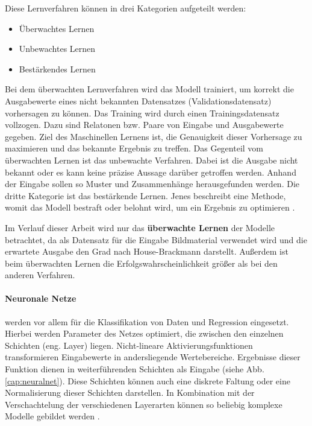Diese  Lernverfahren können in drei Kategorien aufgeteilt werden:
\begin{itemize}
  \setlength\itemsep{-0.5em}
\item Überwachtes Lernen
\item Unbewachtes Lernen
\item Bestärkendes Lernen
\end{itemize}

Bei dem überwachten Lernverfahren wird das Modell trainiert, um korrekt die Ausgabewerte eines nicht bekannten Datensatzes (Validationsdatensatz) vorhersagen zu können. Das Training wird durch einen Trainingsdatensatz vollzogen. Dazu sind Relatonen bzw. Paare von Eingabe und Ausgabewerte gegeben. Ziel des Maschinellen Lernens ist, die Genauigkeit dieser Vorhersage zu maximieren und das bekannte Ergebnis zu treffen. Das Gegenteil vom überwachten Lernen ist das unbewachte Verfahren. Dabei ist die Ausgabe nicht bekannt oder es kann keine präzise Aussage darüber getroffen werden. Anhand der Eingabe sollen so Muster und Zusammenhänge herausgefunden werden. Die dritte Kategorie ist das bestärkende Lernen. Jenes beschreibt eine Methode, womit das Modell bestraft oder belohnt wird, um ein Ergebnis zu optimieren \cite{machinelearning_1}.

Im Verlauf dieser Arbeit wird nur das \textbf{überwachte Lernen} der Modelle betrachtet, da als Datensatz für die Eingabe Bildmaterial verwendet wird und die erwartete Ausgabe den Grad nach House-Brackmann darstellt. Außerdem ist beim überwachten Lernen die Erfolgswahrscheinlichkeit größer als bei den anderen Verfahren.


\paragraph{Neuronale Netze} werden vor allem für die Klassifikation von Daten und Regression eingesetzt. Hierbei werden Parameter des Netzes optimiert, die zwischen den einzelnen Schichten (eng. Layer) liegen. Nicht-lineare Aktivierungsfunktionen transformieren Eingabewerte in andersliegende Wertebereiche. Ergebnisse dieser Funktion dienen in weiterführenden Schichten als Eingabe (siehe Abb. \ref{cap:neuralnet}). Diese Schichten können auch eine diskrete Faltung oder eine Normalisierung dieser Schichten darstellen. In Kombination mit der Verschachtelung der verschiedenen Layerarten können so beliebig komplexe Modelle gebildet werden \cite{machinelearning_3}.


